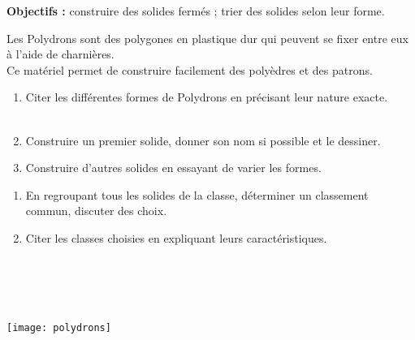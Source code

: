 \activites

\begin{activite}
   {\bf Objectifs :} construire des solides fermés ; trier des solides selon leur forme.
   \begin{QCM}
      Les Polydrons sont des polygones en plastique dur qui peuvent se fixer entre eux à l'aide de charnières. \\
      Ce matériel permet de construire facilement des polyèdres et des patrons. \\
         \begin{enumerate}
            \item Citer les différentes formes de Polydrons en précisant leur nature exacte. \\ [3mm]
               \pf \\
            \item Construire un premier solide, donner son nom si possible et le dessiner. \\ [35mm]
            
            \item Construire d'autres solides en essayant de varier les formes.
         \end{enumerate}       
       \begin{enumerate}
          \item En regroupant tous les solides de la classe, déterminer un classement commun, discuter des choix.
          \item Citer les classes choisies en expliquant leurs caractéristiques. \\ [3mm]
             \pf \\ [3mm]
             \pf \\ [3mm]
             \pf \\ [3mm]
             \pf \\ [3mm]
             \pf
       \end{enumerate}
    \begin{center}
         \texttt{[image: polydrons]} \\
      \end{center}
   \end{QCM}
\end{activite}


\cours 

